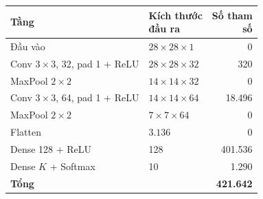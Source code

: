 \begin{tabular}{llr}
\toprule
Tầng & \makecell[l]{Kích thước\\đầu ra} & \makecell[r]{Số tham\\số} \\
\midrule
Đầu vào & $28\times28\times1$ & 0 \\
Conv $3{\times}3$, 32, pad 1 + ReLU & $28\times28\times32$ & 320 \\
MaxPool $2{\times}2$ & $14\times14\times32$ & 0 \\
Conv $3{\times}3$, 64, pad 1 + ReLU & $14\times14\times64$ & 18{.}496 \\
MaxPool $2{\times}2$ & $7\times7\times64$ & 0 \\
Flatten & $3{.}136$ & 0 \\
Dense 128 + ReLU & 128 & 401{.}536 \\
Dense $K$ + Softmax & 10 & 1{.}290 \\
\midrule
\textbf{Tổng} &  & \textbf{421{.}642} \\
\bottomrule
\end{tabular}
